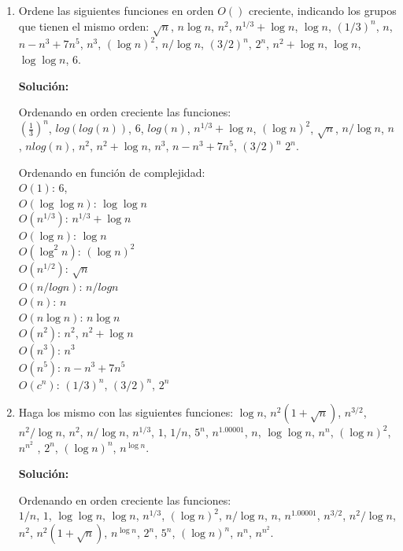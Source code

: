 \documentclass{article}
\begin{document}
\begin{enumerate}[label=\textbf{\alph*.}]
  \item Ordene las siguientes funciones en orden $O()$ creciente, indicando los grupos que tienen el mismo orden: $\sqrt{n}$, $n\log n$, $n^2$, $n^{1/3}+\log n$, $\log n$, $(1/3)^n$, $n$, $n-n^3+7n^5$, $n^3$, $(\log n)^2$, $n/\log n$, $(3/2)^n$, $2^n$, $n^2+\log n$, $\log n$, $\log \log n$, $6$.

  \textbf{Solución:}
     
  Ordenando en orden creciente las funciones:\\
  $(\frac{1}{3})^n$, $log(log(n))$, $6$, $log(n)$, $n^{1/3}+\log n$, $(\log n)^2$, $\sqrt{n}$, $n/\log n$, $n$, $nlog(n)$, $n^2$, $n^2+\log n$, $n^3$, $n-n^3+7n^5$, $(3/2)^n$ $2^n$.
  
  Ordenando en función de complejidad:\\
  \textbf{$O(1)$}: $6$, \\
  \textbf{$O(\log \log n)$}: $\log \log n$ \\
  \textbf{$O(n^{1/3})$}: $n^{1/3}+\log n$ \\
  \textbf{$O(\log n)$}: $\log n$ \\
  \textbf{$O(\log^2 n)$}: $(\log n)^2$ \\
  \textbf{$O(n^{1/2})$}: $\sqrt{n}$ \\
  \textbf{$O(n/logn)$}: $n/logn$ \\
  \textbf{$O(n)$}: $n$ \\
  \textbf{$O(n\log n)$}: $n\log n$\\
  \textbf{$O(n^2)$}: $n^2$, $n^2+\log n$ \\
  \textbf{$O(n^3)$}: $n^3$ \\
  \textbf{$O(n^5)$}: $n-n^3+7n^5$ \\
  \textbf{$O(c^n)$}: $(1/3)^n$, $(3/2)^n$, $2^n$ \\

  \item Haga los mismo con las siguientes funciones: $\log n$, $n^2(1+\sqrt{n})$, $n^{3/2}$, $n^2/\log n$, $n^2$, $n/\log n$, $n^{1/3}$, $1$, $1/n$, $5^n$, $n^{1.00001}$, $n$, $\log \log n$, $n^n$, $(\log n)^2$, $n^{n^2}$ , $2^n$, $(\log n)^n$, $n^{\log n}$.
  
  \textbf{Solución:}
     
  Ordenando en orden creciente las funciones:\\
  $1/n$, $1$, $\log \log n$, $\log n$, $n^{1/3}$, $(\log n)^2$, $n/\log n$, $n$, $n^{1.00001}$, $n^{3/2}$, $n^2/\log n$, $n^2$, $n^2(1+\sqrt{n})$, $n^{\log n}$, $2^n$, $5^n$, $(\log n)^n$, $n^n$, $n^{n^2}$.
  

\end{enumerate}
\end{document}
